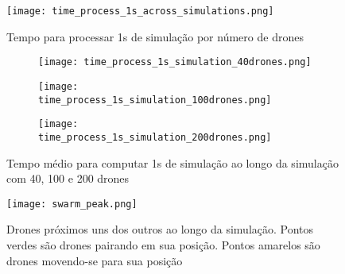 \begin{figure}[ht]
    \centering
    \texttt{[image: time\_process\_1s\_across\_simulations.png]}
    \caption{Tempo para processar 1s de simulação por número de drones}
    \label{fig:time_process_across}
\end{figure}


\begin{figure}
    \centering
    \begin{subfigure}[b]{0.4\textwidth}
        \centering
        \texttt{[image: time\_process\_1s\_simulation\_40drones.png]}
    \end{subfigure}
    \hfill
    \begin{subfigure}[b]{0.4\textwidth}
        \centering
        \texttt{[image: time\_process\_1s\_simulation\_100drones.png]}
    \end{subfigure}
    \begin{subfigure}[b]{0.5\textwidth}
        \centering
        \texttt{[image: time\_process\_1s\_simulation\_200drones.png]}
    \end{subfigure}
    \caption{Tempo médio para computar 1s de simulação ao longo da simulação com 40, 100 e 200 drones}
    \label{fig:drone_times}
\end{figure}

\begin{figure}[ht]
    \centering
    \texttt{[image: swarm\_peak.png]}
    \caption{Drones próximos uns dos outros ao longo da simulação. Pontos verdes são drones pairando em sua posição. Pontos amarelos são drones movendo-se para sua posição }
    \label{fig:time_peak}
\end{figure}
